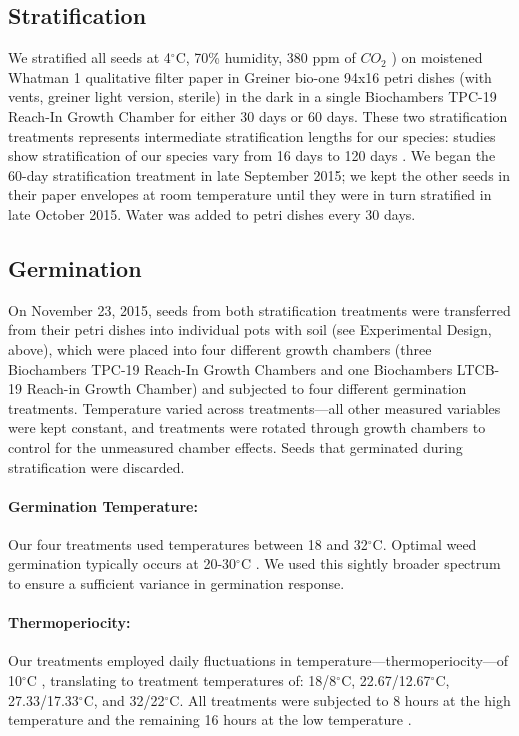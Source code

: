 \documentclass[12pt]{article}\usepackage[]{graphicx}\usepackage[]{color}
\begin{document}
	\subsection{Stratification}
	We stratified all seeds at 4$^\circ$C, 70\% humidity, 380 ppm of $CO_2$ \textcite[e.g.,][]{Meekins1999,Popay1970}) on moistened Whatman 1 qualitative filter paper in Greiner bio-one 94x16 petri dishes (with vents, greiner light version, sterile) in the dark \parencite{Baskin1998,Popay1970} in a single Biochambers TPC-19 Reach-In Growth Chamber for either 30 days or 60 days. These two stratification treatments represents intermediate stratification lengths for our species: studies show stratification of our species vary from 16 days \parencite{Popay1970} to 120 days \parencite{Meekins1999}. We began the 60-day stratification treatment in late September 2015; we kept the other seeds in their paper envelopes at room temperature until they were in turn stratified in late October 2015.  Water was added to petri dishes every 30 days.
	
	\subsection{Germination }
	On November 23, 2015, seeds from both stratification treatments were transferred from their petri dishes into individual pots with soil (see Experimental Design, above), which were placed into four different growth chambers (three Biochambers TPC-19 Reach-In Growth Chambers and one Biochambers LTCB-19 Reach-in Growth Chamber) and subjected to four different germination treatments. Temperature varied across treatments---all other measured variables were kept constant, and treatments were rotated through growth chambers to control for the unmeasured chamber effects. Seeds that germinated during stratification were discarded.
	
	\paragraph{Germination Temperature:} Our four treatments used temperatures between 18 and 32$^\circ$C. Optimal weed germination typically occurs at 20-30$^\circ$C \parencite{Hartmann2010,Steinbauer1957,Wulff1994,Popay1970}. We used this  sightly broader spectrum to ensure a sufficient variance in germination response.
	
	\paragraph{Thermoperiocity:} Our treatments employed daily fluctuations in temperature---thermoperiocity---of 10$^\circ$C \parencite[see e.g.,][]{Steinbauer1957, Toole1963,ISTA1954}, translating to treatment temperatures of: 18/8$^\circ$C, 22.67/12.67$^\circ$C, 27.33/17.33$^\circ$C, and 32/22$^\circ$C. All treatments were subjected to 8 hours at the high temperature and the remaining 16 hours at the low temperature \parencite{Baskin1998,Roberts1981,Popay1970,Probert2000}. %
	
\end{document}
